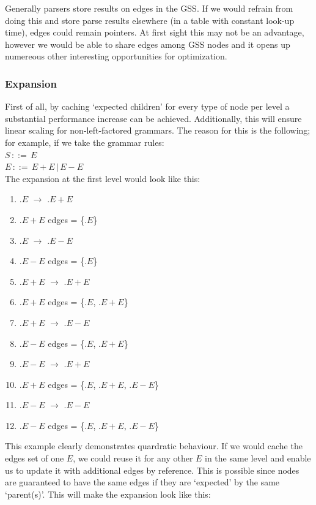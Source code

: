 \documentclass[a4paper,10pt]{article}
\begin{document}
Generally parsers store results on edges in the GSS. If we would refrain from doing this and store parse results elsewhere (in a table with constant look-up time), edges could remain pointers. At first sight this may not be an advantage, however we would be able to share edges among GSS nodes and it opens up numereous other interesting opportunities for optimization.

\subsubsection{Expansion}
\label{sec:nodeExpansionOptimization}
First of all, by caching `expected children' for every type of node per level a substantial performance increase can be achieved. Additionally, this will ensure linear scaling for non-left-factored grammars. The reason for this is the following; for example, if we take the grammar rules:\\
$S\,::=\,E$\\
$E\,::=\,E + E\,|\,E - E$\\
The expansion at the first level would look like this:
\begin{enumerate}
 \setlength{\itemsep}{0pt}
 \setlength{\parskip}{0pt}
 \setlength{\parsep}{0pt}
 
 \item $.E$ $\rightarrow$ $.E+E$
 \item $.E+E$ edges = \{$.E$\}
 \item $.E$ $\rightarrow$ $.E-E$
 \item $.E-E$ edges = \{$.E$\}
 \item $.E+E$ $\rightarrow$ $.E+E$
 \item $.E+E$ edges = \{$.E$, $.E+E$\}
 \item $.E+E$ $\rightarrow$ $.E-E$
 \item $.E-E$ edges = \{$.E$, $.E+E$\}
 \item $.E-E$ $\rightarrow$ $.E+E$
 \item $.E+E$ edges = \{$.E$, $.E+E$, $.E-E$\}
 \item $.E-E$ $\rightarrow$ $.E-E$
 \item $.E-E$ edges = \{$.E$, $.E+E$, $.E-E$\}
\end{enumerate}
This example clearly demonstrates quardratic behaviour. If we would cache the edges set of one $E$, we could reuse it for any other $E$ in the same level and enable us to update it with additional edges by reference. This is possible since nodes are guaranteed to have the same edges if they are `expected' by the same `parent(s)'. This will make the expansion look like this:
\end{document}
